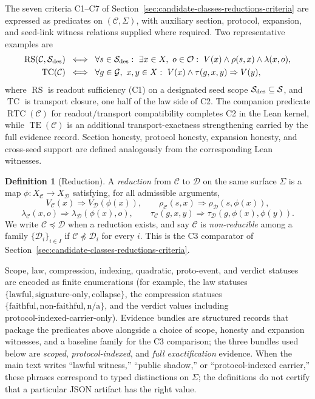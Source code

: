 \documentclass[11pt]{article}
\theoremstyle{definition}
\newtheorem{definition}[theorem]{Definition}
\begin{document}
The seven criteria C1--C7 of
Section~\ref{sec:candidate-classes-reductions-criteria} are expressed as predicates
on $(\mathcal{C}, \Sigma)$, with auxiliary section, protocol, expansion, and
seed-link witness relations supplied where required. Two representative examples are
\begin{align*}
\operatorname{RS}(\mathcal{C}, \mathcal{S}_{\textup{des}}) &\;\iff\;
\forall s \in \mathcal{S}_{\textup{des}}:\ \exists x \in X,\ o \in \mathcal{O}:\
V(x) \wedge \rho(s, x) \wedge \lambda(x, o), \\
\operatorname{TC}(\mathcal{C}) &\;\iff\;
\forall g \in \mathcal{G},\ x, y \in X:\
V(x) \wedge \tau(g, x, y) \Rightarrow V(y),
\end{align*}
where $\operatorname{RS}$ is readout sufficiency (C1) on a designated seed scope
$\mathcal{S}_{\textup{des}} \subseteq \mathcal{S}$, and $\operatorname{TC}$ is
transport closure, one half of the law side of C2. The companion predicate
$\operatorname{RTC}(\mathcal{C})$ for readout/transport compatibility completes
C2 in the Lean kernel, while $\operatorname{TE}(\mathcal{C})$ is an additional
transport-exactness strengthening carried by the full evidence record. Section
honesty, protocol honesty, expansion honesty, and cross-seed support are
defined analogously from the corresponding Lean witnesses.

\begin{definition}[Reduction]
A \emph{reduction} from $\mathcal{C}$ to $\mathcal{D}$ on the same surface $\Sigma$
is a map $\phi \colon X_{\mathcal{C}} \to X_{\mathcal{D}}$ satisfying, for all
admissible arguments,
\[
V_{\mathcal{C}}(x) \Rightarrow V_{\mathcal{D}}(\phi(x)), \qquad
\rho_{\mathcal{C}}(s, x) \Rightarrow \rho_{\mathcal{D}}(s, \phi(x)),
\]
\[
\lambda_{\mathcal{C}}(x, o) \Rightarrow \lambda_{\mathcal{D}}(\phi(x), o),
\qquad
\tau_{\mathcal{C}}(g, x, y) \Rightarrow \tau_{\mathcal{D}}(g, \phi(x), \phi(y)).
\]
We write $\mathcal{C} \preceq \mathcal{D}$ when a reduction exists, and say
$\mathcal{C}$ is \emph{non-reducible} among a family
$\{\mathcal{D}_i\}_{i \in I}$ if $\mathcal{C} \not\preceq \mathcal{D}_i$ for every
$i$. This is the C3 comparator of
Section~\ref{sec:candidate-classes-reductions-criteria}.
\end{definition}

Scope, law, compression, indexing, quadratic, proto-event, and verdict statuses are
encoded as finite enumerations (for example, the law statuses $\{\text{lawful},
\text{signature-only}, \text{collapse}\}$, the compression statuses
$\{\text{faithful}, \text{non-faithful}, \text{n/a}\}$, and the verdict values
including $\text{protocol-indexed-carrier-only}$). Evidence bundles are structured
records that package the predicates above alongside a choice of scope, honesty and
expansion witnesses, and a baseline family for the C3 comparison; the three bundles
used below are \emph{scoped}, \emph{protocol-indexed}, and \emph{full
exactification} evidence. When the main text writes ``lawful witness,'' ``public
shadow,'' or ``protocol-indexed carrier,'' these phrases correspond to typed
distinctions on $\Sigma$; the definitions do not certify that a particular
JSON artifact has the right value.
\end{document}
